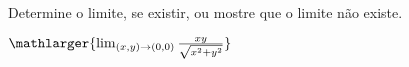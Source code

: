 Determine o limite, se existir, ou mostre que o limite não existe.

$\mathlarger{\lim_{(x,y)\rightarrow(0,0)} \frac{xy}{\sqrt{x^2+y^2}}}$